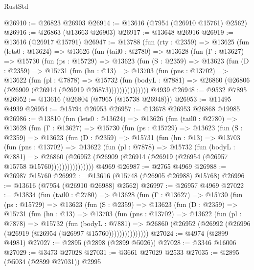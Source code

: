 \begin{lexlean}{RustStd}
\begin{coremodule}
@26910 := @26823 @26903
@26914 := @13616 (@7954 (@26910 @15761) @2562)
@26916 := @26863 (@13663 @26903)
@26917 := @13648 @26916
@26919 := @13616 (@26917 @15791)
@26947 := @13788
    (fun (rty : @2359) =>
    @13625
      (fun (lets0 : @13624) =>
      @13626
        (fun (tail0 : @2780) =>
        @13628
          (fun (Γ : @13627) =>
          @15730
            (fun (ps : @15729) =>
            @13623
              (fun (S : @2359) =>
              @13623
                (fun (D : @2359) =>
                @15731
                  (fun (hn : @13) =>
                  @13703
                    (fun (pns : @13702) =>
                    @13622
                      (fun (pl : @7878) =>
                      @15732
                        (fun (bodyL : @7881) =>
                        @26860 (@26806 (@26909 (@26914 (@26919 @26873)))))))))))))))
    @4939
@26948 := @9532 @7895
@26952 := @13616 (@26804 (@7965 (@15738 @26948)))
@26953 := @11495 @4939
@26954 := @15794 @26953
@26957 := @13678 @26953 @26868 @19985
@26986 := @13810
    (fun (lets0 : @13624) =>
    @13626
      (fun (tail0 : @2780) =>
      @13628
        (fun (Γ : @13627) =>
        @15730
          (fun (ps : @15729) =>
          @13623
            (fun (S : @2359) =>
            @13623
              (fun (D : @2359) =>
              @15731
                (fun (hn : @13) =>
                @13703
                  (fun (pns : @13702) =>
                  @13622
                    (fun (pl : @7878) =>
                    @15732
                      (fun (bodyL : @7881) =>
                      @26860
                        (@26952
                          (@26909 (@26914 (@26919 (@26954 (@26957 @15758 @15760))))))))))))))))
    @4969
@26987 := @2765 @4969
@26988 := @26987 @15760
@26992 := @13616 (@15748 (@26905 @26988) @15768)
@26996 := @13616 (@7954 (@26910 @26988) @2562)
@26997 := @26957 @4969
@27022 := @13834
    (fun (tail0 : @2780) =>
    @13628
      (fun (Γ : @13627) =>
      @15730
        (fun (ps : @15729) =>
        @13623
          (fun (S : @2359) =>
          @13623
            (fun (D : @2359) =>
            @15731
              (fun (hn : @13) =>
              @13703
                (fun (pns : @13702) =>
                @13622
                  (fun (pl : @7878) =>
                  @15732
                    (fun (bodyL : @7881) =>
                    @26860 (@26952 (@26992 (@26996 (@26919 (@26954 (@26997 @15760)))))))))))))))
@27024 := @4974 (@2899 @4981)
@27027 := @2895 (@2898 (@2899 @5026))
@27028 := @3346 @16006
@27029 := @3473 @27028
@27031 := @3661 @27029 @2533
@27035 := @2895 (@5034 (@2899 @27031)) @2995

\end{coremodule}
\end{lexlean}
